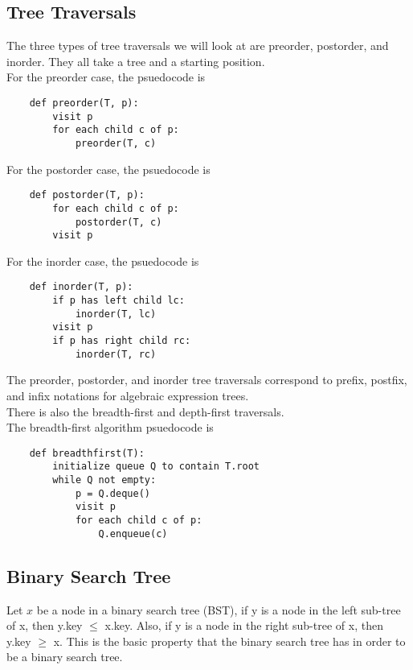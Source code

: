 \documentclass[]{article}
\begin{document}
\subsection{Tree Traversals}\bigbreak

The three types of tree traversals we will look at are preorder, postorder, and inorder. They all take a tree and a starting position.\\

For the preorder case, the psuedocode is

\begin{lstlisting}
	def preorder(T, p):
		visit p
		for each child c of p:
			preorder(T, c)
\end{lstlisting}\bigbreak

For the postorder case, the psuedocode is

\begin{lstlisting}
	def postorder(T, p):
		for each child c of p:
			postorder(T, c)
		visit p
\end{lstlisting}\bigbreak

For the inorder case, the psuedocode is

\begin{lstlisting}
	def inorder(T, p):
		if p has left child lc:
			inorder(T, lc)
		visit p
		if p has right child rc:
			inorder(T, rc)
\end{lstlisting}\bigbreak

The preorder, postorder, and inorder tree traversals correspond to prefix, postfix, and infix notations for algebraic expression trees.\\

There is also the breadth-first and depth-first traversals.\\

The breadth-first algorithm psuedocode is

\begin{lstlisting}
	def breadthfirst(T):
		initialize queue Q to contain T.root
		while Q not empty:
			p = Q.deque()
			visit p
			for each child c of p:
				Q.enqueue(c)
\end{lstlisting}


\subsection{Binary Search Tree}\bigbreak

Let $x$ be a node in a binary search tree (BST), if y is a node in the left sub-tree of x, then y.key $\leq$ x.key. Also, if y is a node in the right sub-tree of x, then y.key $\geq$ x. This is the basic property that the binary search tree has in order to be a binary search tree.\\
\end{document}
